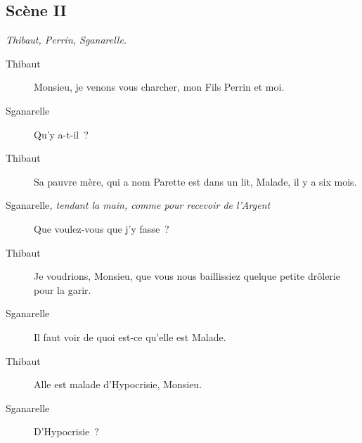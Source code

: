 \documentclass[french,twoside]{book} %
\begin{document}
\subsection[{Scène II}]{Scène II}
\label{III02}
\textit{Thibaut, Perrin, Sganarelle.}\par
 \begin{description} \item[Thibaut] 

Monsieu, je venons vous charcher, mon Fils Perrin et moi.\end{description}
 \begin{description} \item[Sganarelle] 

Qu’y a-t-il ?\end{description}
 \begin{description} \item[Thibaut] 

Sa pauvre mère, qui a nom Parette est dans un lit, Malade, il y a six mois.\end{description}
 \begin{description} \item[Sganarelle\textit{, tendant la main, comme pour recevoir de l’Argent}\par
] 

Que voulez-vous que j’y fasse ?\end{description}
 \begin{description} \item[Thibaut] 

Je voudrions, Monsieu, que vous nous baillissiez quelque petite drôlerie pour la garir.\end{description}
 \begin{description} \item[Sganarelle] 

Il faut voir de quoi est-ce qu’elle est Malade.\end{description}
 \begin{description} \item[Thibaut] 

Alle est malade d’Hypocrisie, Monsieu.\end{description}
 \begin{description} \item[Sganarelle] 

D’Hypocrisie ?\end{description}
\end{document}
